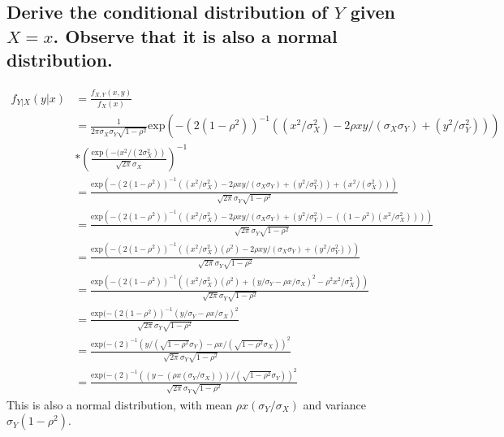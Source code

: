 \documentclass[11pt]{article} %
\begin{document}
\subsection{Derive the conditional distribution of $Y$ given $X=x$. Observe that it is also a normal distribution.}
\begin{align*}
f_{Y|X}(y|x) &= \frac{f_{X,Y}(x,y)}{f_X(x)}\\ &= \frac{1}{2\pi\sigma_X\sigma_Y\sqrt{1-\rho^2}}\text{exp}\left( -(2(1-\rho^2))^{-1}((x^2/\sigma_X^2) - 2\rho xy/(\sigma_X\sigma_Y) + (y^2/\sigma_Y^2))\right) \\ &*\left(\frac{\text{exp}\left(  -(x^2/(2\sigma_X^2)\right)}{\sqrt{2\pi}\sigma_X} \right)^{-1} \\
&=  \frac{\text{exp}(-(2(1-\rho^2))^{-1}((x^2/\sigma_X^2) - 2\rho xy/(\sigma_X\sigma_Y) + (y^2/\sigma_Y^2))+ (x^2/(\sigma_X^2)))}{\sqrt{2\pi}\sigma_Y\sqrt{1-\rho^2}}\\
&= \frac{\text{exp}(-(2(1-\rho^2))^{-1}((x^2/\sigma_X^2) - 2\rho xy/(\sigma_X\sigma_Y) + (y^2/\sigma_Y^2) - ((1-\rho^2)(x^2/\sigma_X^2))))}{\sqrt{2\pi}\sigma_Y\sqrt{1-\rho^2}}\\
&= \frac{\text{exp}(-(2(1-\rho^2))^{-1}((x^2/\sigma_X^2)(\rho^2 ) - 2\rho xy/(\sigma_X\sigma_Y) + (y^2/\sigma_Y^2)))}{\sqrt{2\pi}\sigma_Y\sqrt{1-\rho^2}}\\
&= \frac{\text{exp}(-(2(1-\rho^2))^{-1}((x^2/\sigma_X^2)(\rho^2 ) + (y/\sigma_Y - \rho x/\sigma_X)^2- \rho^2x^2/\sigma_X^2 ))}{\sqrt{2\pi}\sigma_Y\sqrt{1-\rho^2}}\\
&= \frac{\text{exp}(-(2(1-\rho^2))^{-1}(y/\sigma_Y - \rho x/\sigma_X)^2}{\sqrt{2\pi}\sigma_Y\sqrt{1-\rho^2}}\\
&= \frac{\text{exp}(-(2)^{-1}(y/(\sqrt{1-\rho^2}\sigma_Y) - \rho x/(\sqrt{1-\rho^2}\sigma_X))^2}{\sqrt{2\pi}\sigma_Y\sqrt{1-\rho^2}}\\
&= \frac{\text{exp}(-(2)^{-1}((y - (\rho x (\sigma_Y/\sigma_X)))/(\sqrt{1-\rho^2}\sigma_Y))^2}{\sqrt{2\pi}\sigma_Y\sqrt{1-\rho^2}}
\end{align*}
This is also a normal distribution, with mean $\rho x (\sigma_Y/\sigma_X)$ and variance $\sigma_Y(1-\rho^2)$.
\end{document}
